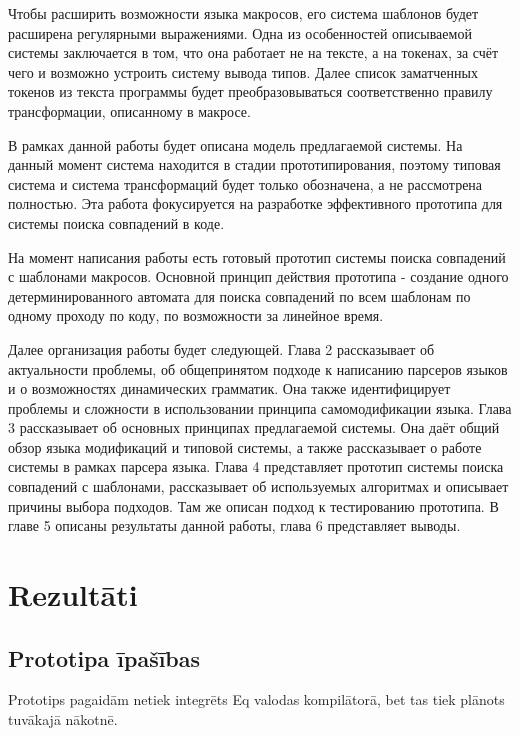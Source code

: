 \documentclass[12pt, a4paper]{report}
\begin{document}
Чтобы расширить возможности языка макросов, его система шаблонов будет расширена регулярными выражениями. Одна из особенностей описываемой системы заключается в том, что она работает не на тексте, а на токенах, за счёт чего и возможно устроить систему вывода типов. Далее список заматченных токенов из текста программы будет преобразовываться соответственно правилу трансформации, описанному в макросе.

В рамках данной работы будет описана модель предлагаемой системы. На данный момент система находится в стадии прототипирования, поэтому типовая система и система трансформаций будет только обозначена, а не рассмотрена полностью. Эта работа фокусируется на разработке эффективного прототипа для системы поиска совпадений в коде.

На момент написания работы есть готовый прототип системы поиска совпадений с шаблонами макросов. Основной принцип действия прототипа - создание одного детерминированного автомата для поиска совпадений по всем шаблонам по одному проходу по коду, по возможности за линейное время.

Далее организация работы будет следующей. Глава 2 рассказывает об актуальности проблемы, об общепринятом подходе к написанию парсеров языков и о возможностях динамических грамматик. Она также идентифицирует проблемы и сложности в использовании принципа самомодификации языка. Глава 3 рассказывает об основных принципах предлагаемой системы. Она даёт общий обзор языка модификаций и типовой системы, а также рассказывает о работе системы в рамках парсера языка. Глава 4 представляет прототип системы поиска совпадений с шаблонами, рассказывает об используемых алгоритмах и описывает причины выбора подходов. Там же описан подход к тестированию прототипа. В главе 5 описаны результаты данной работы, глава 6 представляет выводы.



%





\section{Rezultāti}
\subsection{Prototipa īpašības}
 Prototips pagaidām netiek integrēts Eq valodas kompilātorā, bet tas tiek plānots tuvākajā nākotnē.
\end{document}
